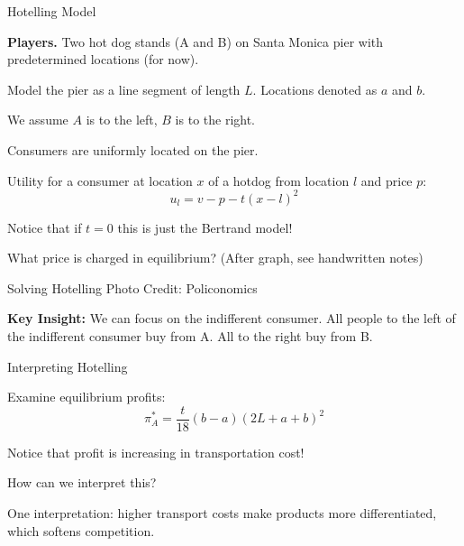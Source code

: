 \documentclass[aspectratio=169]{beamer}
\newenvironment{wideitemize}{\itemize\addtolength{\itemsep}{10pt}}{\enditemize}
\begin{document}
\begin{frame}{Hotelling Model}

\begin{wideitemize}
    \item \textbf{Players.} Two hot dog stands (A and B) on Santa Monica pier with predetermined locations (for now).
    \item Model the pier as a line segment of length $L$. Locations denoted as $a$ and $b$.
    \item We assume $A$ is to the left, $B$ is to the right.
    \item Consumers are uniformly located on the pier.
    \item Utility for a consumer at location $x$ of a hotdog from location $l$ and price $p$:
    \[u_l = v -p-t(x-l)^2\]
    \item Notice that if $t=0$ this is just the Bertrand model!
    \item What price is charged in equilibrium? (After graph, see handwritten notes)
\end{wideitemize}

\end{frame}

\begin{frame}{Solving Hotelling}
    \hfill Photo Credit: Policonomics
    \vspace{4mm}
    
    \textbf{Key Insight:} We can focus on the indifferent consumer. All people to the left of the indifferent consumer buy from A. All to the right buy from B.
\end{frame}


\begin{frame}{Interpreting Hotelling}

\begin{wideitemize}
    \item Examine equilibrium profits:
\[\pi^*_A = \frac{t}{18} (b-a)(2L+a+b)^2\]
\item Notice that profit is increasing in transportation cost!
\item How can we interpret this?\pause
\item One interpretation: higher transport costs make products more differentiated, which softens competition.
\end{wideitemize}
\end{frame}
\end{document}

